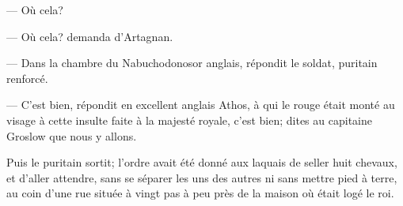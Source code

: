 — Où cela?

— Où cela? demanda d'Artagnan.

— Dans la chambre du Nabuchodonosor anglais, répondit le soldat, puritain renforcé.

— C'est bien, répondit en excellent anglais Athos, à qui le rouge était monté au visage à cette insulte faite à la majesté royale, c'est bien; dites au capitaine Groslow que nous y allons.

Puis le puritain sortit; l'ordre avait été donné aux laquais de seller huit chevaux, et d'aller attendre, sans se séparer les uns des autres ni sans mettre pied à terre, au coin d'une rue située à vingt pas à peu près de la maison où était logé le roi.